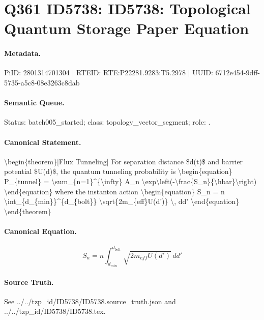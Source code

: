 \section*{Q361 ID5738: ID5738: Topological Quantum Storage Paper Equation}
\paragraph{Metadata.}
PiID: 2801314701304 | RTEID: RTE:P22281.9283:T5.2978 | UUID: 6712e454-9dff-5735-a5c8-08e3263c8dab

\paragraph{Semantic Queue.}
Status: batch005\_started; class: topology\_vector\_segment; role: .

\paragraph{Canonical Statement.}
\textbackslash{}begin\{theorem\}[Flux Tunneling] For separation distance \$d(t)\$ and barrier potential \$U(d)\$, the quantum tunneling probability is \textbackslash{}begin\{equation\} P\_\{tunnel\} = \textbackslash{}sum\_\{n=1\}\textasciicircum{}\{\textbackslash{}infty\} A\_n \textbackslash{}exp\textbackslash{}left(-\textbackslash{}frac\{S\_n\}\{\textbackslash{}hbar\}\textbackslash{}right) \textbackslash{}end\{equation\} where the instanton action \textbackslash{}begin\{equation\} S\_n = n \textbackslash{}int\_\{d\_\{min\}\}\textasciicircum{}\{d\_\{bolt\}\} \textbackslash{}sqrt\{2m\_\{eff\}U(d')\} \textbackslash{}, dd' \textbackslash{}end\{equation\} \textbackslash{}end\{theorem\}

\paragraph{Canonical Equation.}
\[
\begin{equation} S_n = n \int_{d_{min}}^{d_{bolt}} \sqrt{2m_{eff}U(d')} \, dd' \end{equation}
\]

\paragraph{Source Truth.}
See ../../tzp\_id/ID5738/ID5738.source\_truth.json and ../../tzp\_id/ID5738/ID5738.tex.
